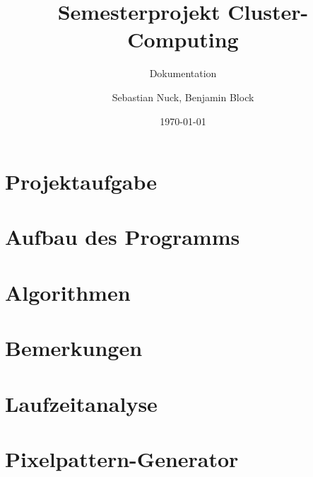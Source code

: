 \documentclass[11pt,oneside,a4paper,parskip]{scrartcl}
\author{Sebastian Nuck, Benjamin Block}
\title{Semesterprojekt Cluster-Computing}
\subtitle{Dokumentation}
\date{\today}
\begin{document}

\maketitle
\tableofcontents

\section{Projektaufgabe}



\section{Aufbau des Programms}



\section{Algorithmen}



\section{Bemerkungen}



\section{Laufzeitanalyse}



\section{Pixelpattern-Generator}


\end{document}
